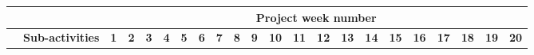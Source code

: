\begin{table}[ht!]
    \begin{tabular}{lp{2.5in}|llllllllllllllllllll|}
    \cline{3-22}
                                                                           &                                                                            & \multicolumn{20}{c|}{\cellcolor[HTML]{00E2FF}\textbf{Project week number}}                                                                                                                                                                                                                                                                                                                                                                                                                                                                                                                                                                                                                                                                                                                                                                                                                                                                                                                                                                                                                                                                                          \\ \hline
    \rowcolor[HTML]{00E2FF} 
    \multicolumn{1}{|l|}{\cellcolor[HTML]{00E2FF}\textbf{Activities}}      & \textbf{Sub-activities}                                                    & \multicolumn{1}{l|}{\cellcolor[HTML]{00E2FF}\textbf{1}} & \multicolumn{1}{l|}{\cellcolor[HTML]{00E2FF}\textbf{2}} & \multicolumn{1}{l|}{\cellcolor[HTML]{00E2FF}\textbf{3}} & \multicolumn{1}{l|}{\cellcolor[HTML]{00E2FF}\textbf{4}} & \multicolumn{1}{l|}{\cellcolor[HTML]{00E2FF}\textbf{5}} & \multicolumn{1}{l|}{\cellcolor[HTML]{00E2FF}\textbf{6}} & \multicolumn{1}{l|}{\cellcolor[HTML]{00E2FF}\textbf{7}} & \multicolumn{1}{l|}{\cellcolor[HTML]{00E2FF}\textbf{8}} & \multicolumn{1}{l|}{\cellcolor[HTML]{00E2FF}\textbf{9}} & \multicolumn{1}{l|}{\cellcolor[HTML]{00E2FF}\textbf{10}} & \multicolumn{1}{l|}{\cellcolor[HTML]{00E2FF}\textbf{11}} & \multicolumn{1}{l|}{\cellcolor[HTML]{00E2FF}\textbf{12}} & \multicolumn{1}{l|}{\cellcolor[HTML]{00E2FF}\textbf{13}} & \multicolumn{1}{l|}{\cellcolor[HTML]{00E2FF}\textbf{14}} & \multicolumn{1}{l|}{\cellcolor[HTML]{00E2FF}\textbf{15}} & \multicolumn{1}{l|}{\cellcolor[HTML]{00E2FF}\textbf{16}} & \multicolumn{1}{l|}{\cellcolor[HTML]{00E2FF}\textbf{17}} & \multicolumn{1}{l|}{\cellcolor[HTML]{00E2FF}\textbf{18}} & \multicolumn{1}{l|}{\cellcolor[HTML]{00E2FF}\textbf{19}} & \textbf{20} \\ \hline

\end{tabular}
\end{table}
